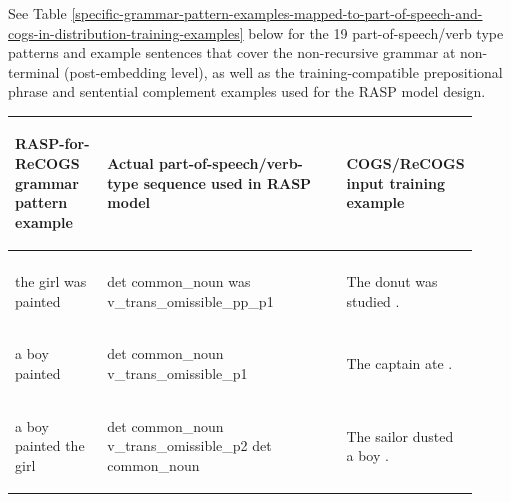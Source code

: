 \documentclass[11pt]{article}
\begin{document}
See Table \ref{specific-grammar-pattern-examples-mapped-to-part-of-speech-and-cogs-in-distribution-training-examples} below for the 19 part-of-speech/verb type patterns and example sentences that cover the non-recursive grammar at non-terminal (post-embedding level), as well as the training-compatible prepositional phrase and sentential complement examples used for the RASP model design.

\clearpage
\onecolumn
\begin{table}
\centering
\begin{tabular}{p{0.2\linewidth} p{0.52\linewidth} p{0.2\linewidth}}
\hline
\begin{small}\textbf{RASP-for-ReCOGS grammar pattern example}\end{small} & \begin{small}\textbf{Actual part-of-speech/verb-type sequence used in RASP model}\end{small} & \begin{small}\textbf{COGS/ReCOGS input training example}\end{small}\\
\hline
\begin{small}\end{small} & \begin{small}\end{small} & \begin{small}\end{small} \\
\begin{small}the girl was painted\end{small} & \begin{small}det common\_noun was v\_trans\_omissible\_pp\_p1 \end{small} & \begin{small}The donut was studied .\end{small} \\
\begin{small}a boy painted\end{small} & \begin{small}det common\_noun v\_trans\_omissible\_p1 \end{small} & \begin{small}The captain ate .\end{small} \\
\begin{small}a boy painted the girl\end{small} & \begin{small}det common\_noun v\_trans\_omissible\_p2 det common\_noun \end{small} & \begin{small}The sailor dusted a boy .\end{small} \\

\end{tabular}
\end{table}
\end{document}
